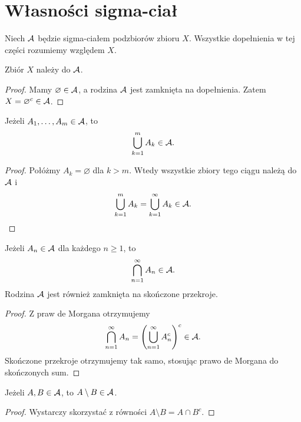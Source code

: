 \section{Własności sigma-ciał}
\label{sec:wlasnosci-sigma-cial}

Niech $\mathcal{A}$ będzie sigma-ciałem podzbiorów zbioru $X$.
Wszystkie dopełnienia w tej części rozumiemy względem $X$.

\begin{fakt}
Zbiór $X$ należy do $\mathcal{A}$.
\end{fakt}

\begin{proof}
Mamy $\varnothing\in\mathcal{A}$, a rodzina $\mathcal{A}$ jest zamknięta na dopełnienia.
Zatem $X=\varnothing^c\in\mathcal{A}$.
\end{proof}

\begin{fakt}
Jeżeli $A_1,\ldots,A_m\in\mathcal{A}$, to
\[
  \bigcup_{k=1}^{m}A_k\in\mathcal{A}.
\]
\end{fakt}

\begin{proof}
Połóżmy $A_k=\varnothing$ dla $k>m$. Wtedy wszystkie zbiory tego ciągu
należą do $\mathcal{A}$ i
\[
  \bigcup_{k=1}^{m}A_k=\bigcup_{k=1}^{\infty}A_k\in\mathcal{A}.
\]
\end{proof}

\begin{fakt}
Jeżeli $A_n\in\mathcal{A}$ dla każdego $n\geq1$, to
\[
  \bigcap_{n=1}^{\infty}A_n\in\mathcal{A}.
\]
Rodzina $\mathcal{A}$ jest również zamknięta na skończone przekroje.
\end{fakt}

\begin{proof}
Z praw de Morgana otrzymujemy
\begin{equation}
  \bigcap_{n=1}^{\infty}A_n
  =\left(\bigcup_{n=1}^{\infty}A_n^c\right)^c\in\mathcal{A}.
  \label{eq:przekroj-de-morgan}
\end{equation}
Skończone przekroje otrzymujemy tak samo, stosując prawo de Morgana
do skończonych sum.
\end{proof}

\begin{fakt}
Jeżeli $A,B\in\mathcal{A}$, to $A\setminus B\in\mathcal{A}$.
\end{fakt}

\begin{proof}
Wystarczy skorzystać z równości $A\setminus B=A\cap B^c$.
\end{proof}

